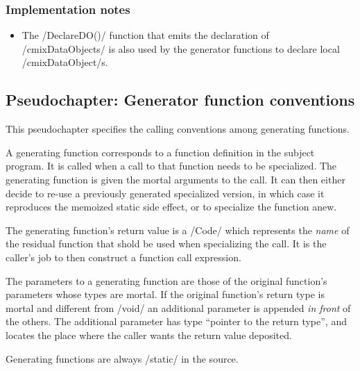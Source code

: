\begin{docpart}
\subsubsection{Implementation notes}
\begin{itemize}
\item The /DeclareDO()/ function that emits the declaration of
	/cmixDataObjects/ is also used by the generator functions
	to declare local /cmixDataObject/s.
\end{itemize}

\subsection{Pseudochapter: Generator function conventions}
\label{sec:gegen:GeneratorFunctionConventions}
This pseudochapter specifies the calling conventions among generating
functions.

A generating function corresponds to a function definition in the
subject program. It is called when a call to that function needs to
be specialized. The generating function is given the mortal arguments
to the call. It can then either decide to re-use a previously
generated specialized version, in which case it reproduces the
memoized static side effect, or to specialize the function anew.

The generating function's return value is a /Code/ which represents
the \emph{name} of the residual function that shold be used when
specializing the call. It is the caller's job to then construct
a function call expression.

The parameters to a generating function are those of the original
function's parameters whose types are mortal. If the original
function's return type is mortal and different from /void/ an
additional parameter is appended \emph{in front} of the others.
The additional parameter has type ``pointer to the return type'', and
locates the place where the caller wants the return value deposited.

Generating functions are always /static/ in the \Pgen{} source.


\end{docpart}
